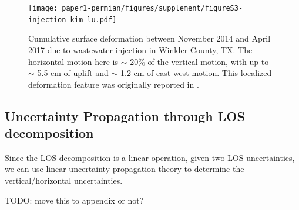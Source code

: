 \begin{figure}
	\centering
	\texttt{[image: paper1-permian/figures/supplement/figureS3-injection-kim-lu.pdf]}
	\caption[Vertical and horizontal deformation near Winkler County, TX]{Cumulative surface deformation between November 2014 and April 2017 due to wastewater injection in Winkler County, TX. The horizontal motion here is $\sim$ 20\% of the vertical motion, with up to $\sim$ 5.5 cm of uplift and $\sim$ 1.2 cm of east-west motion. This localized deformation feature was originally reported in \cite{Kim2018AssociationLocalizedGeohazards}.}
	\label{fig:injection-kim-lu}
\end{figure}




\subsection{Uncertainty Propagation through LOS decomposition}
\label{sec:ch3-decomp-uq-prop}
Since the LOS decomposition is a linear operation, given two LOS uncertainties, we can use linear uncertainty propagation theory to determine the vertical/horizontal uncertainties.

TODO: move this to appendix or not?


